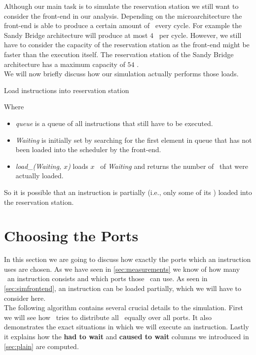Although our main task is to simulate the reservation station we still want to consider the front-end in our analysis. Depending on the microarchitecture the front-end is able to produce a certain amount of \microops\ every cycle. For example the Sandy Bridge architecture will produce at most $4$ \microops\ per cycle. However, we still have to consider the capacity of the reservation station as the front-end might be faster than the execution itself. The reservation station of the Sandy Bridge architecture has a maximum capacity of $54$ \microops.\\
We will now briefly discuss how our simulation actually performs those loads.
\newpage

\begin{algorithm}[H]
    \SetAlgoLined
    \caption{Load instructions into reservation station}
\end{algorithm}
\vspace{5pt}
Where
\begin{itemize}
    \item \emph{queue} is a queue of all instructions that still have to be executed.
    \item \emph{Waiting} is initially set by searching for the first element in queue that has not been loaded into the scheduler by the front-end.
    \item \emph{load\_\microops(Waiting, $x$)} loads $x$ \microops\ of \emph{Waiting} and returns the number of \microops\ that were actually loaded.
\end{itemize}

So it is possible that an instruction is partially (i.e., only some of its \microops) loaded into the reservation station.

\section{Choosing the Ports}
\label{sec:chooseport}

In this section we are going to discuss how exactly the ports which an instruction uses are chosen. As we have seen in \autoref{sec:measurements} we know of how many \microops\ an instruction consists and which ports those \microops\ can use. As seen in \autoref{sec:simfrontend}, an instruction can be loaded partially, which we will have to consider here.\\
The following algorithm contains several crucial details to the simulation. First we will see how \suaca\ tries to distribute all \microops\ equally over all ports. It also demonstrates the exact situations in which we will execute an instruction. Lastly it explains how the \textbf{had to wait} and \textbf{caused to wait} columns we introduced in \autoref{sec:plain} are computed. 
\newpage

